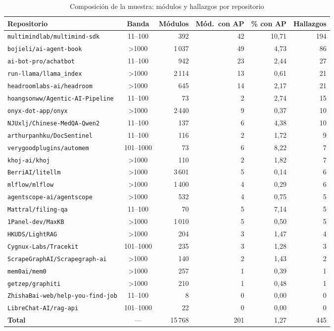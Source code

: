 \begin{table}[t]
\centering
\scriptsize
\setlength{\tabcolsep}{4pt}
\caption{Composición de la muestra: módulos y hallazgos por repositorio}
\label{tab:muestra}
\begin{tabularx}{\textwidth}{@{}X c r r r r@{}}
\toprule
\textbf{Repositorio} & \textbf{Banda} & \textbf{Módulos} & \textbf{Mód.\ con AP} & \textbf{\% con AP} & \textbf{Hallazgos} \\
\midrule
\texttt{multimindlab/multimind-sdk} & 11--100 & 392 & 42 & 10,71 & 194 \\
\texttt{bojieli/ai-agent-book} & >1000 & 1\,037 & 49 & 4,73 & 86 \\
\texttt{ai-bot-pro/achatbot} & 11--100 & 942 & 23 & 2,44 & 27 \\
\texttt{run-llama/llama\_index} & >1000 & 2\,114 & 13 & 0,61 & 21 \\
\texttt{headroomlabs-ai/headroom} & >1000 & 645 & 14 & 2,17 & 21 \\
\texttt{hoangsonww/Agentic-AI-Pipeline} & 11--100 & 73 & 2 & 2,74 & 15 \\
\texttt{onyx-dot-app/onyx} & >1000 & 2\,440 & 9 & 0,37 & 10 \\
\texttt{NJUxlj/Chinese-MedQA-Qwen2} & 11--100 & 137 & 6 & 4,38 & 10 \\
\texttt{arthurpanhku/DocSentinel} & 11--100 & 116 & 2 & 1,72 & 9 \\
\texttt{verygoodplugins/automem} & 101--1000 & 73 & 6 & 8,22 & 7 \\
\texttt{khoj-ai/khoj} & >1000 & 110 & 2 & 1,82 & 7 \\
\texttt{BerriAI/litellm} & >1000 & 3\,601 & 5 & 0,14 & 6 \\
\texttt{mlflow/mlflow} & >1000 & 1\,400 & 4 & 0,29 & 6 \\
\texttt{agentscope-ai/agentscope} & >1000 & 532 & 4 & 0,75 & 5 \\
\texttt{Mattral/filing-qa} & 11--100 & 70 & 5 & 7,14 & 5 \\
\texttt{1Panel-dev/MaxKB} & >1000 & 1\,010 & 5 & 0,50 & 5 \\
\texttt{HKUDS/LightRAG} & >1000 & 204 & 3 & 1,47 & 4 \\
\texttt{Cygnux-Labs/Tracekit} & 101--1000 & 235 & 3 & 1,28 & 3 \\
\texttt{ScrapeGraphAI/Scrapegraph-ai} & >1000 & 140 & 2 & 1,43 & 2 \\
\texttt{mem0ai/mem0} & >1000 & 257 & 1 & 0,39 & 1 \\
\texttt{getzep/graphiti} & >1000 & 210 & 1 & 0,48 & 1 \\
\texttt{ZhishaBai-web/help-you-find-job} & 11--100 & 8 & 0 & 0,00 & 0 \\
\texttt{LibreChat-AI/rag-api} & 101--1000 & 22 & 0 & 0,00 & 0 \\
\midrule
\textbf{Total} & --- & 15\,768 & 201 & 1,27 & 445 \\
\bottomrule
\end{tabularx}
\end{table}
